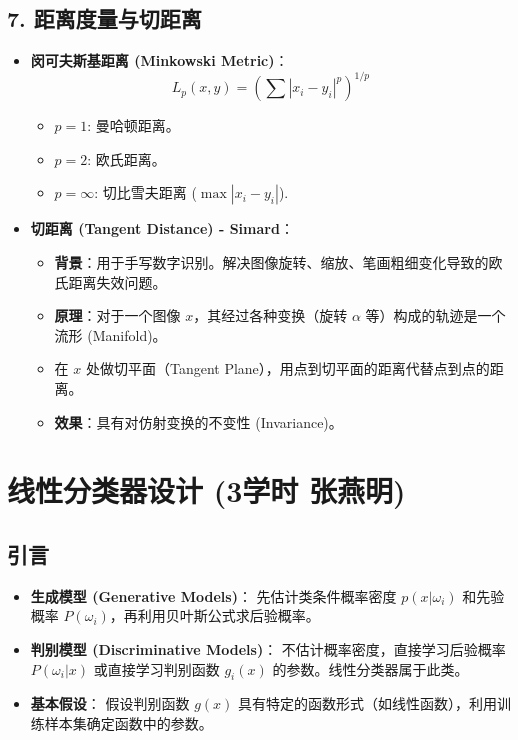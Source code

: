 \documentclass[a4paper, 11pt]{ctexart}
\begin{document}
\subsection{7. 距离度量与切距离}
\begin{itemize}
    \item \textbf{闵可夫斯基距离 (Minkowski Metric)}：
    \[ L_p(x, y) = (\sum |x_i - y_i|^p)^{1/p} \]
    \begin{itemize}
        \item $p=1$: 曼哈顿距离。
        \item $p=2$: 欧氏距离。
        \item $p=\infty$: 切比雪夫距离 ($\max |x_i - y_i|$).
    \end{itemize}
    
    \item \textbf{切距离 (Tangent Distance) - Simard}：
    \begin{itemize}
        \item \textbf{背景}：用于手写数字识别。解决图像旋转、缩放、笔画粗细变化导致的欧氏距离失效问题。
        \item \textbf{原理}：对于一个图像 $x$，其经过各种变换（旋转 $\alpha$ 等）构成的轨迹是一个流形 (Manifold)。
        \item 在 $x$ 处做切平面（Tangent Plane），用点到切平面的距离代替点到点的距离。
        \item \textbf{效果}：具有对仿射变换的不变性 (Invariance)。
    \end{itemize}
\end{itemize}

\newpage
\section{线性分类器设计 \small{(3学时 张燕明)}}

\subsection{引言}
\begin{itemize}
    \item \textbf{生成模型 (Generative Models)}：
    先估计类条件概率密度 $p(x|\omega_i)$ 和先验概率 $P(\omega_i)$，再利用贝叶斯公式求后验概率。
    \item \textbf{判别模型 (Discriminative Models)}：
    不估计概率密度，直接学习后验概率 $P(\omega_i|x)$ 或直接学习判别函数 $g_i(x)$ 的参数。线性分类器属于此类。
    \item \textbf{基本假设}：
    假设判别函数 $g(x)$ 具有特定的函数形式（如线性函数），利用训练样本集确定函数中的参数。
\end{itemize}
\end{document}
